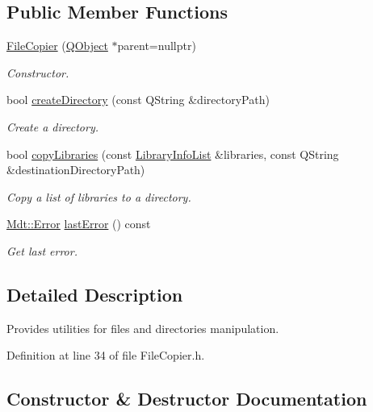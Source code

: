 \subsection*{Public Member Functions}
\begin{DoxyCompactItemize}
\item 
\hyperlink{class_mdt_1_1_deploy_utils_1_1_file_copier_af21c6f7e6fc3074e2fed28d127b29edf}{File\+Copier} (\hyperlink{class_q_object}{Q\+Object} $\ast$parent=nullptr)
\begin{DoxyCompactList}\small\item\em Constructor. \end{DoxyCompactList}\item 
bool \hyperlink{class_mdt_1_1_deploy_utils_1_1_file_copier_ab1040ccbe34149841a42191e7ced3ba4}{create\+Directory} (const Q\+String \&directory\+Path)
\begin{DoxyCompactList}\small\item\em Create a directory. \end{DoxyCompactList}\item 
bool \hyperlink{class_mdt_1_1_deploy_utils_1_1_file_copier_ab81974d2e6e5b2260a8147c3400dcb3a}{copy\+Libraries} (const \hyperlink{class_mdt_1_1_deploy_utils_1_1_library_info_list}{Library\+Info\+List} \&libraries, const Q\+String \&destination\+Directory\+Path)
\begin{DoxyCompactList}\small\item\em Copy a list of libraries to a directory. \end{DoxyCompactList}\item 
\hyperlink{class_mdt_1_1_error}{Mdt\+::\+Error} \hyperlink{class_mdt_1_1_deploy_utils_1_1_file_copier_a8e82df0b666b0cdb45edd878af31893f}{last\+Error} () const 
\begin{DoxyCompactList}\small\item\em Get last error. \end{DoxyCompactList}\end{DoxyCompactItemize}


\subsection{Detailed Description}
Provides utilities for files and directories manipulation. 

Definition at line 34 of file File\+Copier.\+h.



\subsection{Constructor \& Destructor Documentation}

